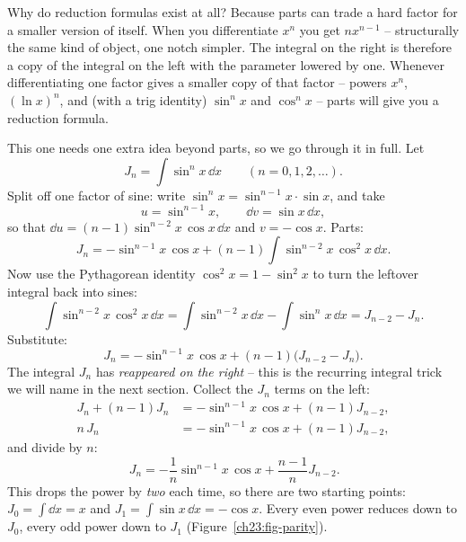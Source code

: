 \begin{whybox}
Why do reduction formulas exist at all? Because parts can trade a hard factor
for a smaller version of itself. When you differentiate $x^n$ you get
$n x^{n-1}$ -- structurally the same kind of object, one notch simpler. The
integral on the right is therefore a copy of the integral on the left with the
parameter lowered by one. Whenever differentiating one factor gives a smaller
copy of that factor -- powers $x^n$, $(\ln x)^n$, and (with a trig identity)
$\sin^n x$ and $\cos^n x$ -- parts will give you a reduction formula.
\end{whybox}

\begin{example}
\label{ch23:ex-redsin}
This one needs one extra idea beyond parts, so we go through it in full. Let
\[
J_n = \int \sin^n x\,\dd x \qquad (n = 0, 1, 2, \dots).
\]
Split off one factor of sine: write $\sin^n x = \sin^{n-1}x\cdot \sin x$, and take
\[
u = \sin^{n-1}x, \qquad \dd v = \sin x\,\dd x,
\]
so that $\dd u = (n-1)\sin^{n-2}x\,\cos x\,\dd x$ and $v = -\cos x$. Parts:
\[
J_n = -\sin^{n-1}x\,\cos x + (n-1)\int \sin^{n-2}x\,\cos^2 x\,\dd x.
\]
Now use the Pythagorean identity $\cos^2 x = 1 - \sin^2 x$ to turn the leftover
integral back into sines:
\[
\int \sin^{n-2}x\,\cos^2 x\,\dd x
= \int \sin^{n-2}x\,\dd x - \int \sin^{n}x\,\dd x = J_{n-2} - J_n.
\]
Substitute:
\[
J_n = -\sin^{n-1}x\,\cos x + (n-1)\big(J_{n-2} - J_n\big).
\]
The integral $J_n$ has \emph{reappeared on the right} -- this is the recurring
integral trick we will name in the next section. Collect the $J_n$ terms on the
left:
\begin{align*}
J_n + (n-1)J_n &= -\sin^{n-1}x\,\cos x + (n-1)J_{n-2},\\
n\,J_n &= -\sin^{n-1}x\,\cos x + (n-1)J_{n-2},
\end{align*}
and divide by $n$:
\[
\boxed{\,J_n = -\frac{1}{n}\sin^{n-1}x\,\cos x + \frac{n-1}{n}J_{n-2}.}
\]
This drops the power by \emph{two} each time, so there are two starting
points: $J_0 = \int \dd x = x$ and
$J_1 = \int \sin x\,\dd x = -\cos x$. Every even power reduces down to $J_0$,
every odd power down to $J_1$ (Figure~\ref{ch23:fig-parity}).
\end{example}

